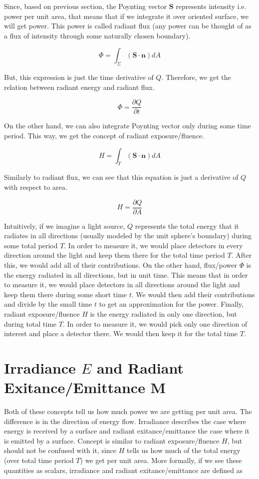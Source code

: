 \documentclass{article}
\begin{document}
Since, based on previous section, the Poynting vector $\mathbf{S}$ represents intensity i.e. power per unit area, that means that if we integrate it over oriented surface, we will get power. This power is called radiant flux (any power can be thought of as a flux of intensity through some naturally chosen boundary).

\[ \Phi = \int_{\Sigma} (\mathbf{S} \cdot \mathbf{n})dA \]

But, this expression is just the time derivative of $Q$. Therefore, we get the relation between radiant energy and radiant flux.

\[ \Phi = \frac{\partial Q}{\partial t} \]

On the other hand, we can also integrate Poynting vector only during some time period. This way, we get the concept of radiant exposure/fluence.

\[ H = \int_{T}(\mathbf{S} \cdot \mathbf{n})dA \]

Similarly to radiant flux, we can see that this equation is just a derivative of $Q$ with respect to area.

\[ H = \frac{\partial Q}{\partial A} \]

Intuitively, if we imagine a light source, $Q$ represents the total energy that it radiates in all directions (usually modeled by the unit sphere's boundary) during some total period $T$. In order to measure it, we would place detectors in every direction around the light and keep them there for the total time period $T$. After this, we would add all of their contributions. On the other hand, flux/power $\Phi$ is the energy radiated in all directions, but in unit time. This means that in order to measure it, we would place detectors in all directions around the light and keep them there during some short time $t$. We would then add their contributions and divide by the small time $t$ to get an approximation for the power. Finally, radiant exposure/fluence $H$ is the energy radiated in only one direction, but during total time $T$. In order to measure it, we would pick only one direction of interest and place a detector there. We would then keep it for the total time $T$.

\section{Irradiance $E$ and Radiant Exitance/Emittance M}

Both of these concepts tell us how much power we are getting per unit area. The difference is in the direction of energy flow. Irradiance describes the case where energy is received by a surface and radiant exitance/emittance the case where it is emitted by a surface. Concept is similar to radiant exposure/fluence $H$, but should not be confused with it, since $H$ tells us how much of the total energy (over total time period $T$) we get per unit area. More formally, if we see these quantities as scalars, irradiance and radiant exitance/emittance are defined as
\end{document}

